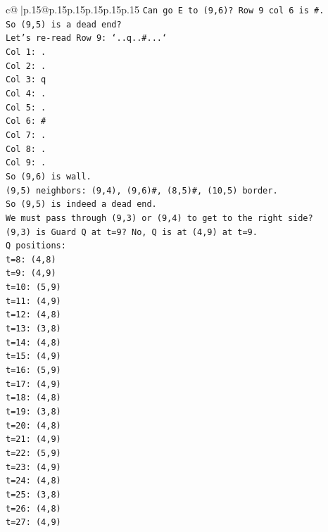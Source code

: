 \documentclass{article}
\begin{document}
{\begin{supertabular}{c@{$\;$}|p{.15\linewidth}@{}p{.15\linewidth}p{.15\linewidth}p{.15\linewidth}p{.15\linewidth}p{.15\linewidth}}
{{{\texttt{Can go E to (9,6)? Row 9 col 6 is \#.} \\
\texttt{So (9,5) is a dead end?} \\
\texttt{Let's re{-}read Row 9: `..q..\#...`} \\
\texttt{Col 1: .} \\
\texttt{Col 2: .} \\
\texttt{Col 3: q} \\
\texttt{Col 4: .} \\
\texttt{Col 5: .} \\
\texttt{Col 6: \#} \\
\texttt{Col 7: .} \\
\texttt{Col 8: .} \\
\texttt{Col 9: .} \\
\texttt{So (9,6) is wall.} \\
\texttt{(9,5) neighbors: (9,4), (9,6)\#, (8,5)\#, (10,5) border.} \\
\texttt{So (9,5) is indeed a dead end.} \\
\texttt{We must pass through (9,3) or (9,4) to get to the right side?} \\
\texttt{(9,3) is Guard Q at t=9? No, Q is at (4,9) at t=9.} \\
\texttt{Q positions:} \\
\texttt{t=8: (4,8)} \\
\texttt{t=9: (4,9)} \\
\texttt{t=10: (5,9)} \\
\texttt{t=11: (4,9)} \\
\texttt{t=12: (4,8)} \\
\texttt{t=13: (3,8)} \\
\texttt{t=14: (4,8)} \\
\texttt{t=15: (4,9)} \\
\texttt{t=16: (5,9)} \\
\texttt{t=17: (4,9)} \\
\texttt{t=18: (4,8)} \\
\texttt{t=19: (3,8)} \\
\texttt{t=20: (4,8)} \\
\texttt{t=21: (4,9)} \\
\texttt{t=22: (5,9)} \\
\texttt{t=23: (4,9)} \\
\texttt{t=24: (4,8)} \\
\texttt{t=25: (3,8)} \\
\texttt{t=26: (4,8)} \\
\texttt{t=27: (4,9)} \\
}}}
\end{supertabular}}
\end{document}
